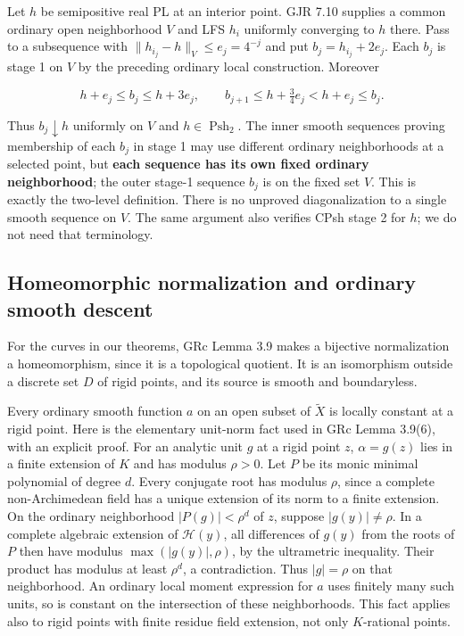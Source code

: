 \documentclass[
  11pt,
]{article}
\begin{document}
Let \(h\) be semipositive real PL at an interior point. GJR 7.10
supplies a common ordinary open neighborhood \(V\) and LFS \(h_i\)
uniformly converging to \(h\) there. Pass to a subsequence with
\(\|h_{i_j}-h\|_V\leq e_j=4^{-j}\) and put \(b_j=h_{i_j}+2e_j\). Each
\(b_j\) is stage 1 on \(V\) by the preceding ordinary local
construction. Moreover

\[
h+e_j\leq b_j\leq h+3e_j,
\qquad b_{j+1}\leq h+\tfrac34 e_j<h+e_j\leq b_j.
\]

Thus \(b_j\downarrow h\) uniformly on \(V\) and
\(h\in\operatorname{Psh}_2\). The inner smooth sequences proving
membership of each \(b_j\) in stage 1 may use different ordinary
neighborhoods at a selected point, but \textbf{each sequence has its own
fixed ordinary neighborhood}; the outer stage-1 sequence \(b_j\) is on
the fixed set \(V\). This is exactly the two-level definition. There is
no unproved diagonalization to a single smooth sequence on \(V\). The
same argument also verifies CPsh stage 2 for \(h\); we do not need that
terminology.

\subsection{Homeomorphic normalization and ordinary smooth
descent}\label{homeomorphic-normalization-and-ordinary-smooth-descent}

For the curves in our theorems, GRc Lemma 3.9 makes a bijective
normalization a homeomorphism, since it is a topological quotient. It is
an isomorphism outside a discrete set \(D\) of rigid points, and its
source is smooth and boundaryless.

Every ordinary smooth function \(a\) on an open subset of
\(\widetilde X\) is locally constant at a rigid point. Here is the
elementary unit-norm fact used in GRc Lemma 3.9(6), with an explicit
proof. For an analytic unit \(g\) at a rigid point \(z\),
\(\alpha=g(z)\) lies in a finite extension of \(K\) and has modulus
\(\rho>0\). Let \(P\) be its monic minimal polynomial of degree \(d\).
Every conjugate root has modulus \(\rho\), since a complete
non-Archimedean field has a unique extension of its norm to a finite
extension. On the ordinary neighborhood \(|P(g)|<\rho^d\) of \(z\),
suppose \(|g(y)|\ne\rho\). In a complete algebraic extension of
\(\mathcal H(y)\), all differences of \(g(y)\) from the roots of \(P\)
then have modulus \(\max(|g(y)|,\rho)\), by the ultrametric inequality.
Their product has modulus at least \(\rho^d\), a contradiction. Thus
\(|g|=\rho\) on that neighborhood. An ordinary local moment expression
for \(a\) uses finitely many such units, so is constant on the
intersection of these neighborhoods. This fact applies also to rigid
points with finite residue field extension, not only \(K\)-rational
points.
\end{document}
